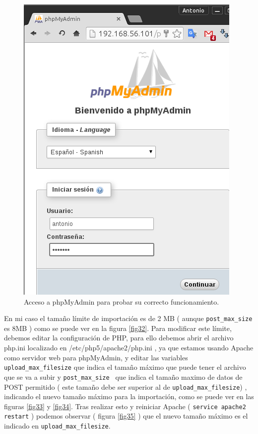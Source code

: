 \begin{figure}[H]
    \begin{center}
        \includegraphics[scale=0.4]{imagenes/img34}
        \caption{Acceso a phpMyAdmin para probar su correcto funcionamiento.}
        \label{fig31}
    \end{center}
\end{figure}


En mi caso el tamaño límite de importación es de 2 MB ( aunque \texttt{post\_max\_size} es 8MB ) como se puede ver en la figura \ref{fig32}. Para modificar este límite, debemos editar la configuración de PHP, para ello debemos abrir el archivo php.ini localizado en /etc/php5/apache2/php.ini , ya que estamos usando Apache como servidor web para phpMyAdmin, y editar las variables \texttt{upload\_max\_filesize} que indica el tamaño máximo que puede tener el archivo que se va a subir \cite{php} y  \texttt{post\_max\_size } que indica el tamaño maximo de datos de POST permitido \cite{php1} ( este tamaño debe ser superior al de \texttt{upload\_max\_filesize}) , indicando el nuevo tamaño máximo para la importación, como se puede ver en las figuras \ref{fig33} y \ref{fig34}. Tras realizar esto y reiniciar Apache ( \texttt{service apache2 restart} ) podemos observar ( figura \ref{fig35} ) que el nuevo tamaño máximo es el indicado en \texttt{upload\_max\_filesize}.

